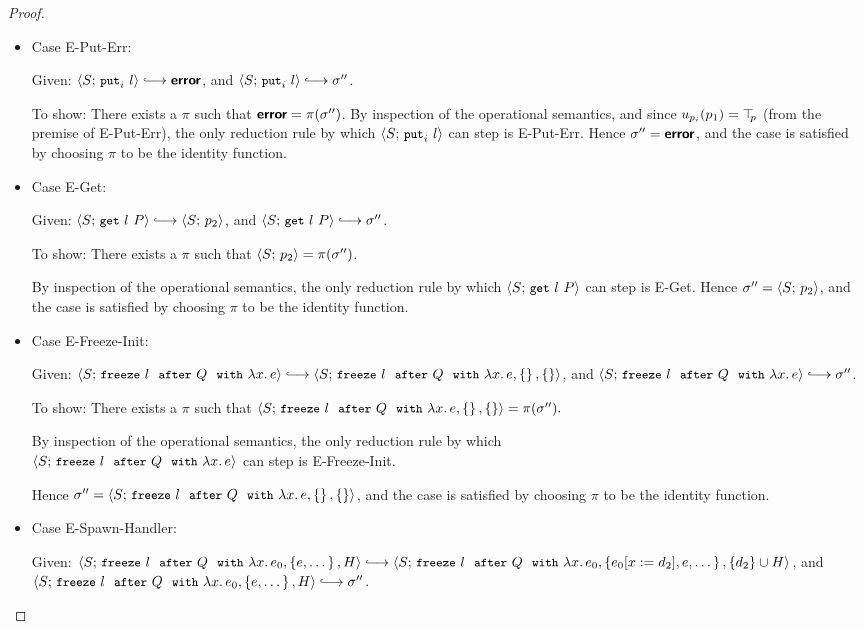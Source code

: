 \begin{proof}
\begin{itemize}
  \item Case {\sc E-Put-Err}:

    Given: $\config{S}{\putiexp{l}} \parstepsto \error$, and
    $\config{S}{\putiexp{l}} \parstepsto \conf''$.

    To show: There exists a $\pi$ such that $\textbf{\textsf{error}} = \pi(\sigma'')$.
    By inspection of the operational semantics, and since
    $u_{p_i}(p_1) = \top\hspace{-0.85mm}_{p}$ (from the premise of {\sc E-Put-Err}), the
    only reduction rule by which $\langle S;\, \mbox{\small{\texttt{put}}}_i~l \rangle$ can step is
    {\sc E-Put-Err}.  Hence $\sigma'' = \textbf{\textsf{error}}$, and the case is
    satisfied by choosing $\pi$ to be the identity function.

  \item Case {\sc E-Get}:

    Given: $\config{S}{\getexp{l}{P}} \parstepsto \config{S}{p_2}$,
    and $\config{S}{\getexp{l}{P}} \parstepsto \conf''$.

    To show: There exists a $\pi$ such that $\langle S;\, p_2 \rangle =
    \pi(\sigma'')$.

    By inspection of the operational semantics, the only reduction
    rule by which $\langle S;\, \mbox{\small{\texttt{get}}}~l~P \rangle$ can step is {\sc E-Get}.
    Hence $\sigma'' = \langle S;\, p_2 \rangle$, and the case is satisfied by
    choosing $\pi$ to be the identity function.

  \item Case {\sc E-Freeze-Init}:

    Given: $\config{S}{\freezeafter{l}{Q}{\lam{x}{e}}} \parstepsto
    \config{S}{\freezeafterfull{l}{Q}{\lam{x}{e}}{\setof{}}{\setof{}}}$,
    and $\config{S}{\freezeafter{l}{Q}{\lam{x}{e}}} \parstepsto \conf''$.

    To show: There exists a $\pi$ such that
    $\langle S;\, \mbox{\small{\texttt{freeze}}}~l~~{\mbox{\small{\texttt{after}}}}~Q~~{\mbox{\small{\texttt{with}}}}~\lambda x.\,e, \left\{\right\}, \left\{\right\} \rangle
    = \pi(\sigma'').$

    By inspection of the operational semantics, the only reduction
    rule by which \\ $\langle S;\, \mbox{\small{\texttt{freeze}}}~l~~{\mbox{\small{\texttt{after}}}}~Q~~{\mbox{\small{\texttt{with}}}}~\lambda x.\,e \rangle$ can
    step is {\sc E-Freeze-Init}.

    Hence $\sigma'' =
    \langle S;\, \mbox{\small{\texttt{freeze}}}~l~~{\mbox{\small{\texttt{after}}}}~Q~~{\mbox{\small{\texttt{with}}}}~\lambda x.\,e, \left\{\right\}, \left\{\right\} \rangle$,
    and the case is satisfied by choosing $\pi$ to be the identity
    function.

  \item Case {\sc E-Spawn-Handler}:

    Given: $\config{S}{\freezeafterfull{l}{Q}{\lam{x}{e_0}}{\setof{e,
          \dots}}{H}} \parstepsto \\
    \config{S}{\freezeafterfull{l}{Q}{\lam{x}{e_0}}{\setof{\subst{e_0}{x}{d_2},
          e, \dots}} {\{d_2\}\cup H}}$, and \\
    $\config{S}{\freezeafterfull{l}{Q}{\lam{x}{e_0}}{\setof{e,
          \dots}}{H}} \parstepsto \conf''$.


\end{itemize}
\end{proof}
